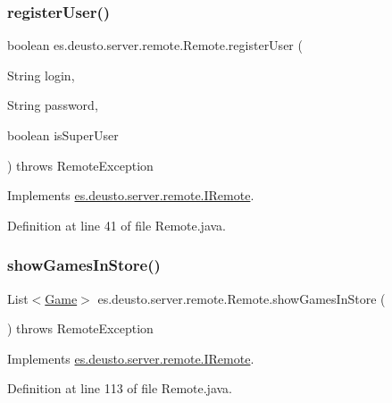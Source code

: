 \subsubsection{\texorpdfstring{register\+User()}{registerUser()}}
{\footnotesize\ttfamily boolean es.\+deusto.\+server.\+remote.\+Remote.\+register\+User (\begin{DoxyParamCaption}\item[{String}]{login,  }\item[{String}]{password,  }\item[{boolean}]{is\+Super\+User }\end{DoxyParamCaption}) throws Remote\+Exception}



Implements \hyperlink{interfacees_1_1deusto_1_1server_1_1remote_1_1_i_remote_af5be134b00959135119e13a5980a4364}{es.\+deusto.\+server.\+remote.\+I\+Remote}.



Definition at line 41 of file Remote.\+java.

\mbox{\label{classes_1_1deusto_1_1server_1_1remote_1_1_remote_ae40a5882d6b3ef3d5928d87dafeb15fa}} 
\subsubsection{\texorpdfstring{show\+Games\+In\+Store()}{showGamesInStore()}}
{\footnotesize\ttfamily List$<$\hyperlink{classes_1_1deusto_1_1server_1_1db_1_1data_1_1_game}{Game}$>$ es.\+deusto.\+server.\+remote.\+Remote.\+show\+Games\+In\+Store (\begin{DoxyParamCaption}{ }\end{DoxyParamCaption}) throws Remote\+Exception}



Implements \hyperlink{interfacees_1_1deusto_1_1server_1_1remote_1_1_i_remote_a091249da31b567c1be29e07085d3ff18}{es.\+deusto.\+server.\+remote.\+I\+Remote}.



Definition at line 113 of file Remote.\+java.

\mbox{\label{classes_1_1deusto_1_1server_1_1remote_1_1_remote_a73569877f9317fc48a4e134977baa304}} 
